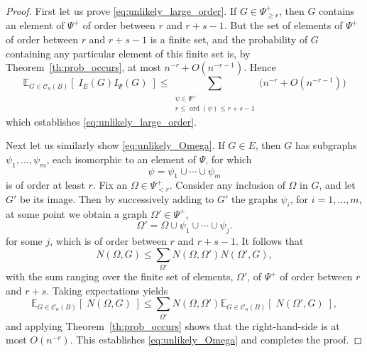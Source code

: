 \documentclass{memo-l}
\theoremstyle{plain}
\theoremstyle{definition}
\numberwithin{section}{chapter}
\numberwithin{equation}{chapter}
\newcommand{\expect}[2]{{\mathbb{E}}_{#1}{\left[\; #2\; \right]}}
\DeclareMathOperator{\ord}{ord}
\theoremstyle{plain}
\theoremstyle{definition}
\newcommand\cC{\mathcal{C}}
\begin{document}
\begin{proof}
First let us prove \eqref{eq:unlikely_large_order}.
If $G\in \Psi^+_{\ge r}$, then
$G$ contains an element of $\Psi^+$ of order
between $r$ and $r+s-1$.  But the set of elements of $\Psi^+$ of
order between $r$ and $r+s-1$ is a finite set, and the probability
of $G$ containing any particular element of this finite set is,
by Theorem~\ref{th:prob_occurs},
at most $n^{-r}+O(n^{-r-1})$. 
Hence
$$
\expect{G\in\cC_n(B)}{I_E(G) I_\Psi(G) } 
\le
\sum_{\substack{\psi\in\Psi^+ \\ r\le\ord(\psi)\le r+s-1}}
\bigl( n^{-r}+O(n^{-r-1}) \bigr)
$$
which establishes \eqref{eq:unlikely_large_order}.

Next let us similarly show \eqref{eq:unlikely_Omega}.
If $G\in E$, then $G$ has subgraphs $\psi_1,\ldots,\psi_m$,
each isomorphic to an element of $\Psi$, for which
$$
\psi=\psi_1\cup\cdots\cup \psi_m 
$$
is of order at least $r$.
Fix an $\Omega\in\Psi^+_{<r}$. Consider any inclusion of $\Omega$
in $G$, and let $G'$ be its image.
Then by successively adding to $G'$ the graphs $\psi_i$, for $i=1,\ldots,m$,
at some point we obtain a graph $\Omega'\in\Psi^+$,
$$
\Omega'=\Omega\cup\psi_1\cup\cdots\cup\psi_j .
$$
for some $j$, which is of order between $r$ and $r+s-1$.
It follows that
\begin{equation}\label{eq:N_iterated}
N(\Omega,G) \le \sum_{\Omega'} N(\Omega,\Omega') N(\Omega',G),
\end{equation}
with the sum ranging over the finite set of elements, $\Omega'$,
of $\Psi^+$ 
of order between $r$ and $r+s$.  Taking expectations yields
$$
\expect{G\in\cC_n(B)}{N(\Omega,G)} \le 
\sum_{\Omega'} N(\Omega,\Omega') \expect{G\in\cC_n(B)}{N(\Omega',G)},
$$
and applying Theorem~\ref{th:prob_occurs} shows that the right-hand-side
is at most $O(n^{-r})$.
This establishes \eqref{eq:unlikely_Omega} and completes the proof.
\end{proof}
\end{document}
